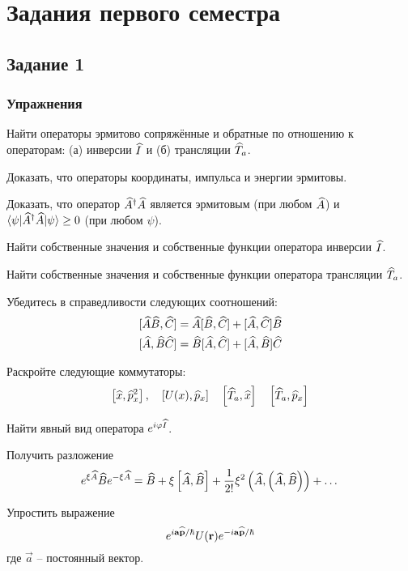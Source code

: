 \appendix

\renewcommand{\thesection}{}
\renewcommand{\thesubsection}{}
\renewcommand{\thesubsubsection}{}

\setcounter{chapter}{0}
\setcounter{section}{0}

\chapter{Задания первого семестра}

\section{Задание 1}

\subsection*{\hfil Упражнения \hfil}

\begin{exercise}
\item\label{ex:1_1_1}%
Найти операторы эрмитово сопряжённые и обратные по отношению к операторам: (а) инверсии $\widehat{I}$ и (б) трансляции $\widehat{T}_a$.
%
\item\label{ex:1_1_2}%
Доказать, что операторы координаты, импульса и энергии эрмитовы.
%
\item\label{ex:1_1_3}%
Доказать, что оператор $\widehat{A}^\dag \widehat{A}$ является эрмитовым (при любом $\widehat{A}$) и $\langle{\psi}|{\widehat{A}^\dag \widehat{A}}|{\psi}\rangle \ge 0$ (при любом $\psi$).
%
\item\label{ex:1_1_4}%
Найти собственные значения и собственные функции оператора инверсии $\widehat{I}$.
%
\item\label{ex:1_1_5}%
Найти собственные значения и собственные функции оператора трансляции $\widehat{T}_a$.
%
\item\label{ex:1_1_6}%
Убедитесь в справедливости следующих соотношений:
$$
\begin{gathered}
{[\widehat{A} \widehat{B}, \widehat{C}]} = \widehat{A} [\widehat{B},\widehat{C}] + [\widehat{A},\widehat{C}]\widehat{B} \\
{[\widehat{A}, \widehat{B} \widehat{C}]} = \widehat{B}[\widehat{A},\widehat{C}] + [\widehat{A},\widehat{B}]\widehat{C}
\end{gathered}
$$
%
\item\label{ex:1_1_7}%
Раскройте следующие коммутаторы:
$$
\left [ {\widehat{x}, \widehat{p}^2_x} \right ], ~~~
\left [ {U(x), \widehat{p}_x} \right ] ~~~
\left [ {\widehat{T}_a, \widehat{x}} \right ] ~~~
\left [ {\widehat{T}_a, \widehat{p}_x} \right ]
$$
%
\item\label{ex:1_1_8}%
Найти явный вид оператора $e^{i\varphi\widehat{I}}$.
%
\item\label{ex:1_1_9}%
Получить разложение
$$
e^{\xi \widehat{A}} \widehat{B} e^{-\xi \widehat{A}}
  = \widehat{B} + \xi \left [ {\widehat{A}, \widehat{B}} \right ]
    + \frac{1}{2!} \xi^2 \left ( {\widehat{A}, \left ( {\widehat{A}, \widehat{B}} \right )} \right ) + \dots
$$
%
\item\label{ex:1_1_10}%
Упростить выражение
$$
e^{i\mathbf{a}\widehat{\mathbf{p}}/\hbar} U(\mathbf{r}) e^{-i\mathbf{a}\widehat{\mathbf{p}}/\hbar}
$$%
%
где $\vec{a}$ -- постоянный вектор.
\end{exercise}

